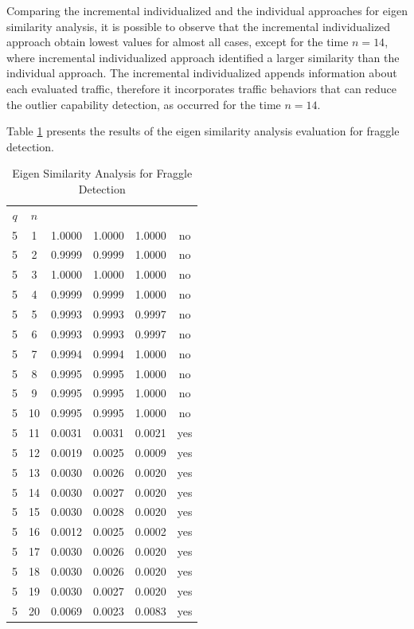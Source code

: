 Comparing the incremental individualized and the individual approaches for eigen similarity analysis, it is possible to observe that the incremental individualized approach obtain lowest values for almost all cases, except for the time $n=14$, where incremental individualized approach identified a larger similarity than the individual approach. The incremental individualized appends information about each evaluated traffic, therefore it incorporates traffic behaviors that can reduce the outlier capability detection, as occurred for the time $n=14$.

Table \ref{tab:2.07} presents the results of the eigen similarity analysis evaluation for fraggle detection.

\begin{table}[h!]
  \centering
  \footnotesize
  \caption{Eigen Similarity Analysis for Fraggle Detection}
  \label{tab:2.07}
  \begin{tabular}{ c c c c c c }
	\toprule
	\multirow{2}{*}{\pmb{Time Frame} $q$} &\multirow{2}{*}{\pmb{Time} $n$}   &\multicolumn{3}{c}{\pmb{Similarity Analysis}} &\multirow{2}{*}{\pmb{Ground Truth}}\\ 
			\hhline{~~---~}
			& &\pmb{Incremental Individualized} &\pmb{Incremental} &\pmb{Individual}\\
	\midrule
	5 &1 &1.0000 &1.0000 &1.0000 &no \\
	5 &2 &0.9999 &0.9999 &1.0000 &no \\
	5 &3 &1.0000 &1.0000 &1.0000 &no \\
	5 &4 &0.9999 &0.9999 &1.0000 &no \\
	5 &5 &0.9993 &0.9993 &0.9997 &no \\
	5 &6 &0.9993 &0.9993 &0.9997 &no \\
	5 &7 &0.9994 &0.9994 &1.0000 &no \\
	5 &8 &0.9995 &0.9995 &1.0000 &no \\
	5 &9 &0.9995 &0.9995 &1.0000 &no \\
	5 &10 &0.9995 &0.9995 &1.0000 &no \\
	5 &11 &0.0031 &0.0031 &0.0021 &yes \\
	5 &12 &0.0019 &0.0025 &0.0009 &yes \\
	5 &13 &0.0030 &0.0026 &0.0020 &yes \\
	5 &14 &0.0030 &0.0027 &0.0020 &yes \\
	5 &15 &0.0030 &0.0028 &0.0020 &yes \\
	5 &16 &0.0012 &0.0025 &0.0002 &yes \\
	5 &17 &0.0030 &0.0026 &0.0020 &yes \\
	5 &18 &0.0030 &0.0026 &0.0020 &yes \\
	5 &19 &0.0030 &0.0027 &0.0020 &yes \\
	5 &20 &0.0069 &0.0023 &0.0083 &yes \\
    \bottomrule
  \end{tabular}
\end{table}

